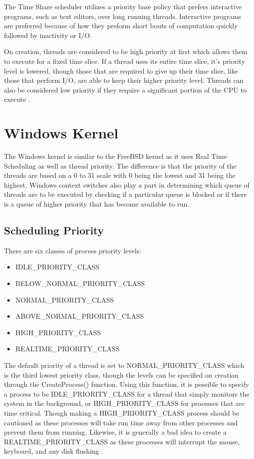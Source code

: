 \documentclass[10pt, draftclsnofoot,onecolumn]{IEEEtran}
\begin{document}
The Time Share scheduler utilizes a priority base policy that prefers interactive programs, such as text editors, over long running threads. Interactive programs are preferred because of how they preform short bouts of computation quickly followed by inactivity or I/O. \par
On creation, threads are considered to be high priority at first which allows them to execute for a fixed time slice. If a thread uses its entire time slice, it's priority level is lowered, though those that are required to give up their time slice, like those that perform I/O, are able to keep their higher priority level. Threads can also be considered low priority if they require a significant portion of the CPU to execute \cite{3}. 

\section{Windows Kernel}

The Windows kernel is similar to the FreeBSD kernel as it uses Real Time Scheduling as well as thread priority. The difference is that the priority of the threads are based on a 0 to 31 scale with 0 being the lowest and 31 being the highest. Windows context switches also play a part in determining which queue of threads are to be executed by checking if a particular queue is blocked or if there is a queue of higher priority that has become available to run.\par 

\subsection{Scheduling Priority}

There are six classes of process priority levels:

\begin{itemize}
  \item IDLE\_PRIORITY\_CLASS
  \item BELOW\_NORMAL\_PRIORITY\_CLASS
  \item NORMAL\_PRIORITY\_CLASS
  \item ABOVE\_NORMAL\_PRIORITY\_CLASS
  \item HIGH\_PRIORITY\_CLASS
  \item REALTIME\_PRIORITY\_CLASS
\end{itemize}

The default priority of a thread is set to NORMAL\_PRIORITY\_CLASS which is the third lowest priority class, though the levels can be specified on creation through the CreateProcess() function. Using this function, it is possible to specify a process to be IDLE\_PRIORITY\_CLASS for a thread that simply monitors the system in the background, or HIGH\_PRIORITY\_CLASS for processes that are time critical. Though making a HIGH\_PRIORITY\_CLASS process should be cautioned as these processes will take run time away from other processes and prevent them from running. Likewise, it is generally a bad idea to create a REALTIME\_PRIORITY\_CLASS as these processes will interrupt the mouse, keyboard, and any disk flushing \cite{1}. 
\end{document}
